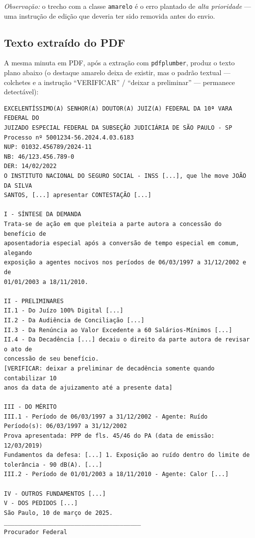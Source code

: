 \documentclass[11pt,a4paper]{article}
\begin{document}
\noindent\textit{Observação:} o trecho com a classe \texttt{amarelo} é o erro
plantado de \emph{alta prioridade} --- uma instrução de edição que deveria ter
sido removida antes do envio.

\subsection{Texto extraído do PDF}
A mesma minuta em PDF, após a extração com \texttt{pdfplumber}, produz o texto
plano abaixo (o destaque amarelo deixa de existir, mas o padrão textual
--- colchetes e a instrução ``VERIFICAR'' / ``deixar a preliminar'' --- permanece
detectável):

\begin{lstlisting}[style=terminal]
EXCELENTÍSSIMO(A) SENHOR(A) DOUTOR(A) JUIZ(A) FEDERAL DA 10ª VARA FEDERAL DO
JUIZADO ESPECIAL FEDERAL DA SUBSEÇÃO JUDICIÁRIA DE SÃO PAULO - SP
Processo nº 5001234-56.2024.4.03.6183
NUP: 01032.456789/2024-11
NB: 46/123.456.789-0
DER: 14/02/2022
O INSTITUTO NACIONAL DO SEGURO SOCIAL - INSS [...], que lhe move JOÃO DA SILVA
SANTOS, [...] apresentar CONTESTAÇÃO [...]

I - SÍNTESE DA DEMANDA
Trata-se de ação em que pleiteia a parte autora a concessão do benefício de
aposentadoria especial após a conversão de tempo especial em comum, alegando
exposição a agentes nocivos nos períodos de 06/03/1997 a 31/12/2002 e de
01/01/2003 a 18/11/2010.

II - PRELIMINARES
II.1 - Do Juízo 100% Digital [...]
II.2 - Da Audiência de Conciliação [...]
II.3 - Da Renúncia ao Valor Excedente a 60 Salários-Mínimos [...]
II.4 - Da Decadência [...] decaiu o direito da parte autora de revisar o ato de
concessão de seu benefício.
[VERIFICAR: deixar a preliminar de decadência somente quando contabilizar 10
anos da data de ajuizamento até a presente data]

III - DO MÉRITO
III.1 - Período de 06/03/1997 a 31/12/2002 - Agente: Ruído
Período(s): 06/03/1997 a 31/12/2002
Prova apresentada: PPP de fls. 45/46 do PA (data de emissão: 12/03/2019)
Fundamentos da defesa: [...] 1. Exposição ao ruído dentro do limite de
tolerância - 90 dB(A). [...]
III.2 - Período de 01/01/2003 a 18/11/2010 - Agente: Calor [...]

IV - OUTROS FUNDAMENTOS [...]
V - DOS PEDIDOS [...]
São Paulo, 10 de março de 2025.
_______________________________________
Procurador Federal
\end{lstlisting}

\end{document}
